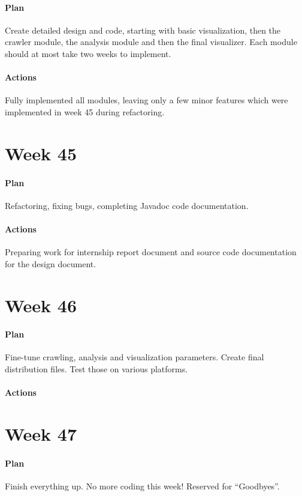 \paragraph{Plan} Create detailed design and code, starting with basic
visualization, then the crawler module, the analysis module and then the final
visualizer. Each module should at most take two weeks to implement.

\paragraph{Actions} Fully implemented all modules, leaving only a few minor
features which were implemented in week 45 during refactoring.

\section{Week 45}

\paragraph{Plan} Refactoring, fixing bugs, completing Javadoc code
documentation.

\paragraph{Actions} Preparing work for internship report document and source
code documentation for the design document.

\section{Week 46}

\paragraph{Plan} Fine-tune crawling, analysis and visualization parameters.
Create final distribution files. Test those on various platforms.

\paragraph{Actions} 

\section{Week 47}

\paragraph{Plan} Finish everything up. No more coding this week! Reserved for
``Goodbyes''.

